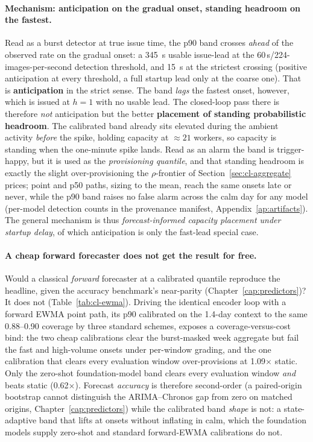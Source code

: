 \paragraph{Mechanism: anticipation on the gradual onset, standing headroom on
the fastest.}
Read as a burst detector at true issue time, the p90 band crosses \emph{ahead}
of the observed rate on the gradual onset: a \SI{345}{\second}
usable issue-lead at the 60\,s/224-images-per-second detection threshold, and
\SI{15}{\second} at the strictest crossing (positive anticipation at
every threshold, a full startup lead only at the coarse one). That is
\textbf{anticipation} in the strict sense. The band
\emph{lags} the fastest onset, however, which is issued at $h{=}1$ with no
usable lead. The closed-loop pass there is therefore \emph{not} anticipation
but the better \textbf{placement of
standing probabilistic headroom}. The calibrated band already sits elevated during the
ambient activity \emph{before} the spike, holding capacity at ${\approx}21$
workers, so capacity is standing when the one-minute spike lands. Read as an
alarm the band is trigger-happy, but it is used as the \emph{provisioning
quantile}, and that standing headroom is exactly the slight over-provisioning
the $\rho$-frontier of Section~\ref{sec:cl-aggregate} prices; point and p50
paths, sizing to the mean, reach the same onsets late or never, while the p90
band raises no false alarm across the calm day for any model (per-model
detection counts in the provenance manifest, Appendix~\ref{ap:artifacts}). The
general mechanism is thus \emph{forecast-informed capacity placement under
startup delay}, of which anticipation is only the fast-lead special case.

\paragraph{A cheap forward forecaster does not get the result for free.} Would
a classical \emph{forward} forecaster at a calibrated quantile reproduce the
headline, given the accuracy benchmark's near-parity
(Chapter~\ref{cap:predictors})? It does not (Table~\ref{tab:cl-ewma}). Driving
the identical encoder loop with a forward EWMA point path, its p90
calibrated on the 1.4-day context to the same 0.88--0.90 coverage by three
standard schemes, exposes a coverage-versus-cost bind: the two cheap
calibrations clear the burst-masked week aggregate but fail the fast and
high-volume onsets under per-window grading, and the one calibration that
clears every evaluation window over-provisions at 1.09$\times$ static. Only the zero-shot
foundation-model band clears every evaluation window \emph{and} beats static
(0.62$\times$). Forecast \emph{accuracy} is therefore second-order (a paired-origin bootstrap cannot
distinguish the ARIMA--Chronos gap from zero on matched origins,
Chapter~\ref{cap:predictors}) while the calibrated band \emph{shape} is not:
a state-adaptive band that lifts at onsets without inflating in calm, which the
foundation models supply zero-shot and standard forward-EWMA calibrations do
not.

